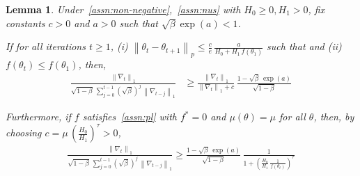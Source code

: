 \documentclass{article}
\newtheorem{lemma}{Lemma}
\newcommand{\norm}[1]{\left\|#1 \right\|}
\newcommand{\tht}{\theta_t}
\newcommand{\thtt}{\theta_{t+1}}
\begin{document}
\begin{lemma}
Under~\cref{assn:non-negative},~\cref{assn:nus} with $H_0 \geq 0, H_1 > 0$, fix constants $c > 0$ and $a > 0$ such that $\sqrt{\beta} \exp(a) < 1$. 

If for all iterations $t \geq 1$, (i) $\norm{\tht - \thtt}_p \leq \frac{c}{e} \, \frac{a}{H_0 + H_1 \, f(\theta_1)}$ such that and (ii) $f(\tht) \leq f(\theta_1)$, then, 
\begin{align*}
\frac{\norm{\nabla_t}_1}{\sqrt{1 - \beta} \, \sum_{j = 0}^{t-1} (\sqrt{\beta})^{j} \, \norm{\nabla_{t-j}}_1} & \geq \frac{\norm{\nabla_t}_1}{\norm{\nabla_t}_1 + c} \, \frac{1 - \sqrt{\beta} \, \exp(a)}{\sqrt{1 - \beta}}     
\end{align*}

Furthermore, if $f$ satisfies~\cref{assn:pl} with $f^* = 0$ and $\mu(\theta) = \mu$ for all $\theta$, then, by choosing $c = \mu \, \left(\frac{H_0}{H_1}\right)^{\tau} > 0$,  
\begin{align*}
\frac{\norm{\nabla_t}_1}{\sqrt{1 - \beta} \, \sum_{j = 0}^{t-1} (\sqrt{\beta})^{j} \, \norm{\nabla_{t-j}}_1} \geq \frac{1 - \sqrt{\beta} \, \exp(a)}{\sqrt{1 - \beta}} \, \frac{1}{1 + \left(\frac{H_0}{H_1} \, \frac{1}{f(\tht)}\right)^{\tau}}
\end{align*}
\label{lemma:rms-ratio-2pl}
\end{lemma}
\end{document}
